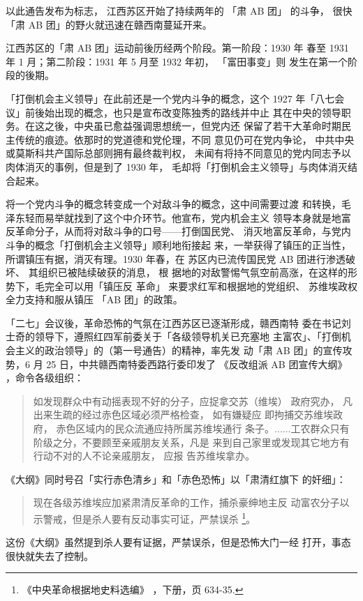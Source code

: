 以此通告发布为标志，
江西苏区开始了持续两年的
「肃 AB 团」
的斗争，
很快「肃 AB 团」的野火就迅速在赣西南蔓延开来。

江西苏区的「肃 AB 团」运动前後历经两个阶段。第一阶段：1930 年
春至 1931 年 1 月；第二阶段：1931 年 5 月至 1932 年初，
「富田事变」则
发生在第一个阶段的後期。

「打倒机会主义领导」在此前还是一个党内斗争的概念，这个 1927
年「八七会议」前後始出现的概念，也只是宣布改变陈独秀的路线并中止
其在中央的领导职务。在这之後，中央虽已愈益强调思想统一，但党内还
保留了若干大革命时期民主传统的痕迹。依那时的党道德和党伦理，不同
意见仍可在党内争论，
中共中央或莫斯科共产国际总部则拥有最终裁判权，
未闻有将持不同意见的党内同志予以肉体消灭的事例，但是到了 1930 年，
毛却将「打倒机会主义领导」与肉体消灭结合起来。

将一个党内斗争的概念转变成一个对敌斗争的概念，这中间需要过渡
和转换，毛泽东轻而易举就找到了这个中介环节。他宣布，党内机会主义
领导本身就是地富反革命分子，从而将对敌斗争的口号——打倒国民党、
消灭地富反革命，与党内斗争的概念「打倒机会主义领导」顺利地衔接起
来，一举获得了镇压的正当性，所谓镇压有据，消灭有理。1930 年春，在
苏区内已流传国民党 AB 团进行渗透破坏、
其组织已被陆续破获的消息，
根
据地的对敌警惕气氛空前高涨，在这样的形势下，毛完全可以用「镇压反
革命」
来要求红军和根据地的党组织、
苏维埃政权全力支持和服从镇压
「AB
团」的政策。

「二七」会议後，革命恐怖的气氛在江西苏区已逐渐形成，赣西南特
委在书记刘士奇的领导下，遵照红四军前委关于「各级领导机关已充塞地
主富农」、「打倒机会主义的政治领导」的（第一号通告）的精神，率先发
动「肃 AB 团」的宣传攻势，6 月 25 日，中共赣西南特委西路行委印发了
《反改组派 AB 团宣传大纲》
，命令各级组织：
\begin{quote}
	\fzwkai 如发现群众中有动摇表现不好的分子，应捉拿交苏（维埃）
政府究办，
凡出来生疏的经过赤色区域必须严格检查，
如有嫌疑应
即拘捕交苏维埃政府，
赤色区域内的民众流通应持所属苏维埃通行
条子。......工农群众只有阶级之分，不要顾至亲戚朋友关系，凡是
来到自己家里或发现其它地方有行动不对的人不论亲戚朋友，
应报
告苏维埃拿办。
\end{quote}
《大纲》同时号召「实行赤色清乡」和「赤色恐怖」以「肃清红旗下
的奸细」：
\begin{quote}
	\fzwkai 现在各级苏维埃应加紧肃清反革命的工作，捕杀豪绅地主反
	动富农分子以示警戒，但是杀人要有反动事实可证，严禁误杀
	\footnote{ 《中央革命根据地史料选编》
，下册，页 634-35.}。
\end{quote}

这份《大纲》虽然提到杀人要有证据，严禁误杀，但是恐怖大门一经
打开，事态很快就失去了控制。

